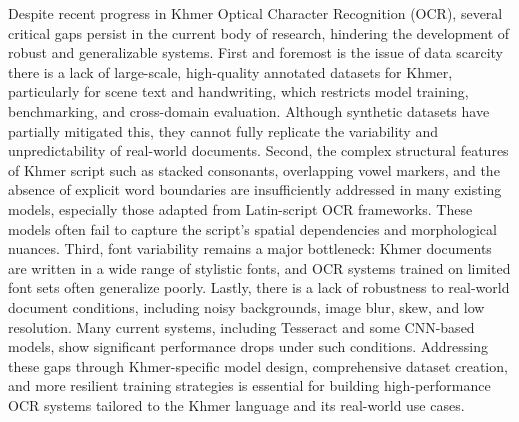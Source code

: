 Despite recent progress in Khmer Optical Character Recognition (OCR), 
several critical gaps persist in the current body of research, hindering the 
development of robust and generalizable systems. First and foremost is the issue of 
data scarcity there is a lack of large-scale, high-quality annotated datasets for Khmer, 
particularly for scene text and handwriting, which restricts model training, benchmarking, 
and cross-domain evaluation. Although synthetic datasets have partially mitigated this, they 
cannot fully replicate the variability and unpredictability of real-world documents. Second, the 
complex structural features of Khmer script such as stacked consonants, overlapping vowel markers, and 
the absence of explicit word boundaries are insufficiently addressed in many existing models, 
especially those adapted from Latin-script OCR frameworks. These models often fail to 
capture the script's spatial dependencies and morphological nuances. Third, font 
variability remains a major bottleneck: Khmer documents are written in a wide range of stylistic 
fonts, and OCR systems trained on limited font sets often generalize poorly. Lastly, there is 
a lack of robustness to real-world document conditions, including noisy backgrounds, image blur, 
skew, and low resolution. Many current systems, including Tesseract and some CNN-based models, 
show significant performance drops under such conditions. Addressing these gaps through 
Khmer-specific model design, comprehensive dataset creation, and more resilient training strategies is 
essential for building high-performance OCR systems tailored to the Khmer language and its 
real-world use cases.